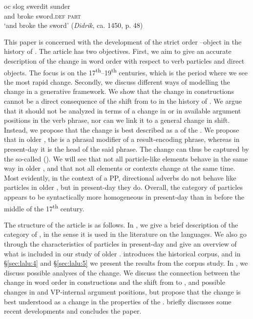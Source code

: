 \documentclass[output=paper]{langscibook}
\begin{document}
\ex
\gll oc    slog     swerdit     sunder\\
      and  broke   sword\textsc{.def}   \textsc{part}\\
  \glt  ‘and broke the sword’ (\textit{Didrik}, ca. 1450, p. 48)

\z
\z

This paper is concerned with the development of the strict order –object in the history of . The article has two objectives. First, we aim to give an accurate description of the change in word order with respect to verb particles and direct objects. The focus is on the 17\textsuperscript{th}--19\textsuperscript{th} centuries, which is the period where we see the most rapid change. Secondly, we discuss different ways of modelling the change in a generative framework. We show that the change in  constructions cannot be a direct consequence of the shift from  to  in the history of . We argue that it should not be analyzed in terms of a change in  or in available argument positions in the verb phrase, nor can we link it to a general change in  shift. Instead, we propose that the change is best described as a  of the . We propose that in older , the  is a phrasal modifier of a result-encoding phrase, whereas in present-day  it is the head of the said phrase. The change can thus be captured by the so-called  (\citealt{van_Gelderen2004}). We will see that not all particle-like elements behave in the same way in older , and that not all elements or contexts change at the same time. Most evidently, in the context of a PP, directional adverbs do not behave like particles in older , but in present-day  they do. Overall, the category of particles appears to be syntactically more homogeneous in present-day  than in  before the middle of the 17\textsuperscript{th} century. 



The structure of the article is as follows. In , we give a brief description of the category of , in the sense it is used in the literature on the  languages. We also go through the characteristics of particles in present-day  and give an overview of what is included in our study of older .  introduces the historical corpus, and in §\ref{sec:lalu:4} and §\ref{sec:lalu:5} we present the results from the corpus study. In , we discuss possible analyses of the change. We discuss the connection between the change in word order in  constructions and the shift from  to , and possible changes in  and VP-internal argument positions, but propose that the change is best understood as a change in the properties of the .  briefly discusses some recent developments and concludes the paper.
\end{document}
